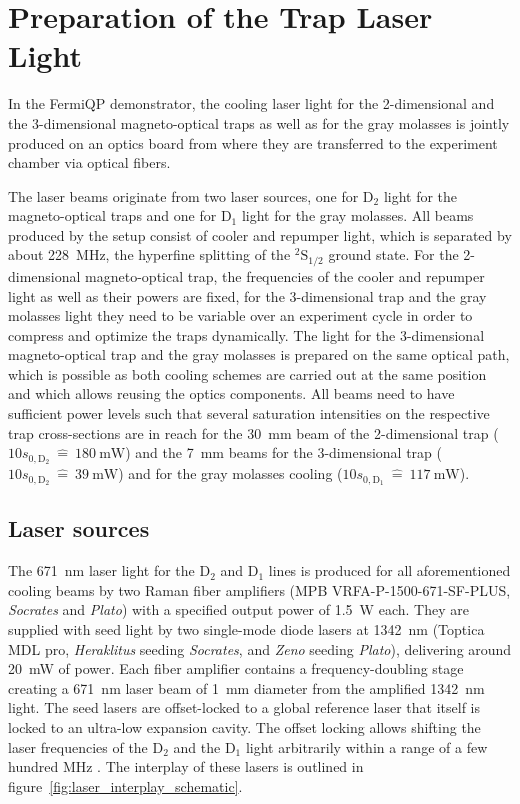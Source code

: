 
\section{Preparation of the Trap Laser Light}
In the FermiQP demonstrator, the cooling laser light for the 2-dimensional and the 3-dimensional magneto-optical traps as well as for the gray molasses is jointly produced on an optics board from where they are transferred to the experiment chamber via optical fibers.

The laser beams originate from two laser sources, one for D$_2$ light for the magneto-optical traps and one for D$_1$ light for the gray molasses. All beams produced by the setup consist of cooler and repumper light, which is separated by about \SI{228}{\mega\hertz}, the hyperfine splitting of the $^2\text{S}_{1/2}$ ground state. For the 2-dimensional magneto-optical trap, the frequencies of the cooler and repumper light as well as their powers are fixed, for the 3-dimensional trap and the gray molasses light they need to be variable over an experiment cycle in order to compress and optimize the traps dynamically. The light for the 3-dimensional magneto-optical trap and the gray molasses is prepared on the same optical path, which is possible as both cooling schemes are carried out at the same position and which allows reusing the optics components. All beams need to have sufficient power levels such that several saturation intensities on the respective trap cross-sections are in reach for the \SI{30}{\milli\meter} beam of the 2-dimensional trap ($10 s_{0, \text{D}_2} ~\hat{=}~ \SI[]{180}{\milli\watt}$) and the \SI{7}{\milli\meter} beams for the 3-dimensional trap ($10 s_{0, \text{D}_2} ~\hat{=}~ \SI[]{39}{\milli\watt}$) and for the gray molasses cooling ($10 s_{0, \text{D}_1} ~\hat{=}~ \SI[]{117}{\milli\watt}$).

\subsection*{Laser sources}
The \SI{671}{\nano\meter} laser light for the D$_2$ and D$_1$ lines is produced for all aforementioned cooling beams by two Raman fiber amplifiers (MPB VRFA-P-1500-671-SF-PLUS, \textit{Socrates} and \textit{Plato}) with a specified output power of \SI{1.5}{\watt} each. They are supplied with seed light by two single-mode diode lasers at \SI{1342}{\nano\meter} (Toptica MDL pro, \textit{Heraklitus} seeding \textit{Socrates}, and \textit{Zeno} seeding \textit{Plato}), delivering around \SI{20}{\milli\watt} of power. Each fiber amplifier contains a frequency-doubling stage creating a \SI{671}{\nano\meter} laser beam of \SI{1}{\milli\meter} diameter from the amplified \SI{1342}{\nano\meter} light. The seed lasers are offset-locked to a global reference laser that itself is locked to an ultra-low expansion cavity. The offset locking allows shifting the laser frequencies of the D$_2$ and the D$_1$ light arbitrarily within a range of a few hundred \si{\mega\hertz} . The interplay of these lasers is outlined in figure~\ref{fig:laser_interplay_schematic}.

